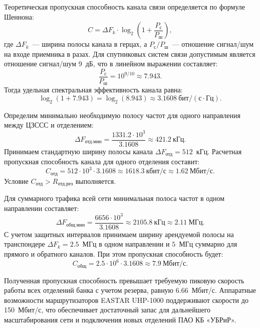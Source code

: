 Теоретическая пропускная способность канала связи определяется по формуле Шеннона:
\begin{equation*}
    C = \Delta F_k \cdot \log_2\!\left(1 + \frac{P_{\text{с}}}{P_{\text{ш}}}\right),
\end{equation*}
где $\Delta F_k$~--- ширина полосы канала в герцах, а $P_{\text{с}}/P_{\text{ш}}$~--- отношение сигнал/шум на входе приемника в разах.
Для спутниковых систем связи допустимым является отношение сигнал/шум 9~дБ, что в линейном выражении составляет:
\begin{equation*}
    \frac{P_{\text{с}}}{P_{\text{ш}}} = 10^{9/10} \approx 7.943.
\end{equation*}
Тогда удельная спектральная эффективность канала равна:
\begin{equation*}
    \log_2(1 + 7.943) = \log_2(8.943) \approx 3.1608~\text{бит/}(\text{с} \cdot \text{Гц}).
\end{equation*}

Определим минимально необходимую полосу частот для одного направления между ЦЗССС и отделением:
\begin{equation*}
    \Delta F_{\text{отд.мин}} = \frac{1331.2 \cdot 10^3}{3.1608} \approx 421.2~\text{кГц}.
\end{equation*}
Принимаем стандартную ширину полосы канала $\Delta F_{\text{отд}} = 512$~кГц.
Расчетная пропускная способность канала для одного отделения составит:
\begin{equation*}
    C_{\text{отд}} = 512 \cdot 10^3 \cdot 3.1608 \approx 1618.3~\text{кбит/с} \approx 1.62~\text{Мбит/с}.
\end{equation*}
Условие $C_{\text{отд}} > R_{\text{отд.рез}}$ выполняется.

Для суммарного трафика всей сети минимальная полоса частот в одном направлении составляет:
\begin{equation*}
    \Delta F_{\text{общ.мин}} = \frac{6656 \cdot 10^3}{3.1608} \approx 2105.8~\text{кГц} \approx 2.11~\text{МГц}.
\end{equation*}
С учетом защитных интервалов принимаем ширину арендуемой полосы на транспондере $\Delta F_k = 2.5$~МГц в одном направлении и $5$~МГц суммарно для прямого и обратного каналов.
При этом пропускная способность будет:
\begin{equation*}
    C_{\text{общ}} = 2.5 \cdot 10^6 \cdot 3.1608 \approx 7.9~\text{Мбит/с}.
\end{equation*}

Полученная пропускная способность превышает требуемую пиковую скорость работы всех отделений банка с учетом резерва, равную $6.66$~Мбит/с.
Аппаратные возможности маршрутизаторов EASTAR UHP-1000 поддерживают скорости до 150~Мбит/с, что обеспечивает достаточный запас для дальнейшего масштабирования сети и подключения новых отделений ПАО КБ «УБРиР».